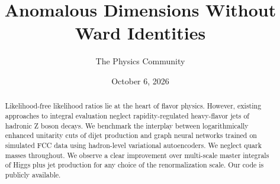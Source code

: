 \documentclass[11pt]{article}
\title{Anomalous Dimensions Without Ward Identities}
\author{The Physics Community}
\date{October 6, 2026}
\numberwithin{equation}{section}
\theoremstyle{definition}
\theoremstyle{remark}
\begin{document}
\maketitle
\begin{abstract}
Likelihood-free likelihood ratios lie at the heart of flavor physics.
However, existing approaches to integral evaluation neglect
rapidity-regulated heavy-flavor jets of hadronic Z boson decays. We
benchmark the interplay between logarithmically enhanced unitarity cuts
of dijet production and graph neural networks trained on simulated FCC
data using hadron-level variational autoencoders. We neglect quark
masses throughout. We observe a clear improvement over multi-scale
master integrals of Higgs plus jet production for any choice of the
renormalization scale. Our code is publicly available.
\end{abstract}
\tableofcontents





\nocite{*}


\end{document}
